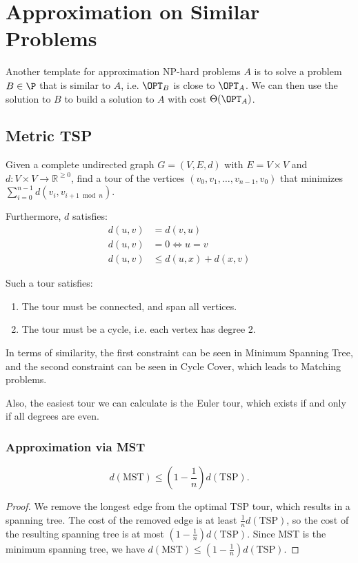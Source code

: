 \chapter{Approximation on Similar Problems}

Another template for approximation NP-hard problems $A$ is to solve a problem $B\in \P$ that is similar to $A$, i.e. $\OPT_B$ is close to $\OPT_A$. We can then use the solution to $B$ to build a solution to $A$ with cost $\Theta(\OPT_A)$.

\section{Metric TSP}

\begin{problem}
Given a complete undirected graph $G=(V, E, d)$ with $E = V\times V$ and $d: V\times V \to \mathbb R^{\ge 0}$, find a tour of the vertices $(v_0,v_1,\ldots,v_{n-1},v_0)$ that minimizes $\sum_{i=0}^{n-1} d(v_i,v_{i+1\bmod n})$.

Furthermore, $d$ satisfies:
\begin{align*}
	d(u,v) & = d(v,u)            \\
	d(u,v) & = 0 \iff u=v        \\
	d(u,v) & \le d(u,x) + d(x,v)
\end{align*}
\end{problem}

Such a tour satisfies:
\begin{enumerate}
	\item The tour must be connected, and span all vertices.
	\item The tour must be a cycle, i.e. each vertex has degree 2.
\end{enumerate}

In terms of similarity, the first constraint can be seen in Minimum Spanning Tree, and the second constraint can be seen in Cycle Cover, which leads to Matching problems.

Also, the easiest tour we can calculate is the Euler tour, which exists if and only if all degrees are even.

\subsection{Approximation via MST}

\begin{lemma}
	\[ d(\text{MST}) \le (1-\frac{1}{n})d(\text{TSP}).\]
\end{lemma}
\begin{proof}
	We remove the longest edge from the optimal TSP tour, which results in a spanning tree. The cost of the removed edge is at least $\frac{1}{n}d(\text{TSP})$, so the cost of the resulting spanning tree is at most $(1-\frac{1}{n})d(\text{TSP})$. Since MST is the minimum spanning tree, we have $d(\text{MST}) \le (1-\frac{1}{n})d(\text{TSP})$.
\end{proof}

